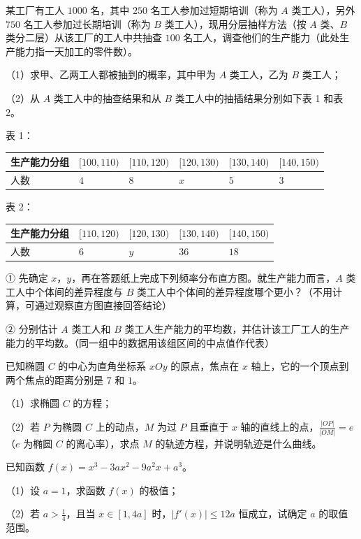 \begin{question}
某工厂有工人 $1000$ 名，其中 $250$ 名工人参加过短期培训（称为 $A$ 类工人），另外 $750$ 名工人参加过长期培训（称为 $B$ 类工人），现用分层抽样方法（按 $A$ 类、$B$ 类分二层）从该工厂的工人中共抽查 $100$ 名工人，调查他们的生产能力（此处生产能力指一天加工的零件数）。

（1）求甲、乙两工人都被抽到的概率，其中甲为 $A$ 类工人，乙为 $B$ 类工人；

（2）从 $A$ 类工人中的抽查结果和从 $B$ 类工人中的抽插结果分别如下表 1 和表 2。

表 1：

\begin{center}
\begin{tabular}{llllll}
\toprule
生产能力分组 & $[100,110)$ & $[110,120)$ & $[120,130)$ & $[130,140)$ & $[140,150)$ \\
\midrule
人数 & $4$ & $8$ & $x$ & $5$ & $3$ \\
\bottomrule
\end{tabular}
\end{center}

表 2：

\begin{center}
\begin{tabular}{lllll}
\toprule
生产能力分组 & $[110,120)$ & $[120,130)$ & $[130,140)$ & $[140,150)$ \\
\midrule
人数 & $6$ & $y$ & $36$ & $18$ \\
\bottomrule
\end{tabular}
\end{center}

① 先确定 $x$，$y$，再在答题纸上完成下列频率分布直方图。就生产能力而言，$A$ 类工人中个体间的差异程度与 $B$ 类工人中个体间的差异程度哪个更小？（不用计算，可通过观察直方图直接回答结论）
\nopagebreak[4]
\begin{center}\end{center}
\nopagebreak[4]
② 分别估计 $A$ 类工人和 $B$ 类工人生产能力的平均数，并估计该工厂工人的生产能力的平均数。（同一组中的数据用该组区间的中点值作代表）

\end{question}
\begin{question}
已知椭圆 $C$ 的中心为直角坐标系 $xOy$ 的原点，焦点在 $x$ 轴上，它的一个顶点到两个焦点的距离分别是 $7$ 和 $1$。

（1）求椭圆 $C$ 的方程；

（2）若 $P$ 为椭圆 $C$ 上的动点，$M$ 为过 $P$ 且垂直于 $x$ 轴的直线上的点，$\frac{|OP|}{|OM|}=e$（$e$ 为椭圆 $C$ 的离心率），求点 $M$ 的轨迹方程，并说明轨迹是什么曲线。

\end{question}
\begin{question}
已知函数 $f(x)=x^3-3ax^2-9a^2x+a^3$。

（1）设 $a=1$，求函数 $f(x)$ 的极值；

（2）若 $a>\frac14$，且当 $x\in[1,4a]$ 时，$|f'(x)|\leqslant12a$ 恒成立，试确定 $a$ 的取值范围。

\end{question}

